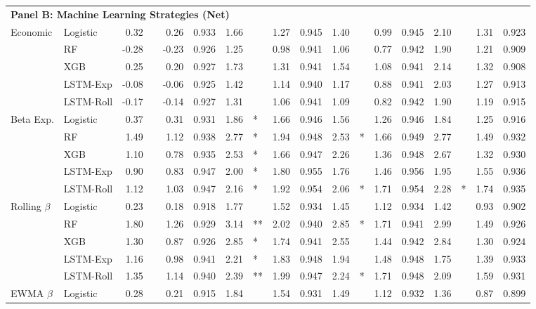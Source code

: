 \begin{table}[htbp]
{\begin{tabular}{l l r l r r r l r r r l r r r l r r}
\midrule
\multicolumn{18}{l}{\textbf{Panel B: Machine Learning Strategies (Net)}} \\
Economic & Logistic & 0.32 &  & 0.26 & 0.933 & 1.66 &  & 1.27 & 0.945 & 1.40 &  & 0.99 & 0.945 & 2.10 &  & 1.31 & 0.923 \\
 & RF & -0.28 &  & -0.23 & 0.926 & 1.25 &  & 0.98 & 0.941 & 1.06 &  & 0.77 & 0.942 & 1.90 &  & 1.21 & 0.909 \\
 & XGB & 0.25 &  & 0.20 & 0.927 & 1.73 &  & 1.31 & 0.941 & 1.54 &  & 1.08 & 0.941 & 2.14 &  & 1.32 & 0.908 \\
 & LSTM-Exp & -0.08 &  & -0.06 & 0.925 & 1.42 &  & 1.14 & 0.940 & 1.17 &  & 0.88 & 0.941 & 2.03 &  & 1.27 & 0.913 \\
 & LSTM-Roll & -0.17 &  & -0.14 & 0.927 & 1.31 &  & 1.06 & 0.941 & 1.09 &  & 0.82 & 0.942 & 1.90 &  & 1.19 & 0.915 \\
\midrule
Beta Exp. & Logistic & 0.37 &  & 0.31 & 0.931 & 1.86 & * & 1.66 & 0.946 & 1.56 &  & 1.26 & 0.946 & 1.84 &  & 1.25 & 0.916 \\
 & RF & 1.49 &  & 1.12 & 0.938 & 2.77 & * & 1.94 & 0.948 & 2.53 & * & 1.66 & 0.949 & 2.77 &  & 1.49 & 0.932 \\
 & XGB & 1.10 &  & 0.78 & 0.935 & 2.53 & * & 1.66 & 0.947 & 2.26 &  & 1.36 & 0.948 & 2.67 &  & 1.32 & 0.930 \\
 & LSTM-Exp & 0.90 &  & 0.83 & 0.947 & 2.00 & * & 1.80 & 0.955 & 1.76 &  & 1.46 & 0.956 & 1.95 &  & 1.55 & 0.936 \\
 & LSTM-Roll & 1.12 &  & 1.03 & 0.947 & 2.16 & * & 1.92 & 0.954 & 2.06 & * & 1.71 & 0.954 & 2.28 & * & 1.74 & 0.935 \\
\midrule
Rolling $\beta$ & Logistic & 0.23 &  & 0.18 & 0.918 & 1.77 &  & 1.52 & 0.934 & 1.45 &  & 1.12 & 0.934 & 1.42 &  & 0.93 & 0.902 \\
 & RF & 1.80 &  & 1.26 & 0.929 & 3.14 & ** & 2.02 & 0.940 & 2.85 & * & 1.71 & 0.941 & 2.99 &  & 1.49 & 0.926 \\
 & XGB & 1.30 &  & 0.87 & 0.926 & 2.85 & * & 1.74 & 0.941 & 2.55 &  & 1.44 & 0.942 & 2.84 &  & 1.30 & 0.924 \\
 & LSTM-Exp & 1.16 &  & 0.98 & 0.941 & 2.21 & * & 1.83 & 0.948 & 1.94 &  & 1.48 & 0.948 & 1.75 &  & 1.39 & 0.933 \\
 & LSTM-Roll & 1.35 &  & 1.14 & 0.940 & 2.39 & ** & 1.99 & 0.947 & 2.24 & * & 1.71 & 0.948 & 2.09 &  & 1.59 & 0.931 \\
\midrule
EWMA $\beta$ & Logistic & 0.28 &  & 0.21 & 0.915 & 1.84 &  & 1.54 & 0.931 & 1.49 &  & 1.12 & 0.932 & 1.36 &  & 0.87 & 0.899 \\

\end{tabular}}
\end{table}
